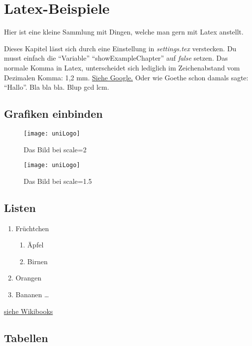\chapter{Latex-Beispiele}
Hier ist eine kleine Sammlung mit Dingen, welche man gern mit Latex anstellt.\par
Dieses Kapitel lässt sich durch eine Einstellung in \emph{settings.tex} verstecken.
Du musst einfach die "`Variable"' \enquote{showExampleChapter} auf \emph{false} setzen.
Das normale Komma in Latex, unterscheidet sich lediglich im Zeichenabstand
vom Dezimalen Komma: 1{,}2 mm. \href{http://google.de}{Siehe Google.}
Oder wie Goethe schon damals sagte: "`Hallo"'\cite[chapter, p.~215]{goethe2016wilhelm}.
Bla bla bla. \parencite[see][p10]{lamport1994latex} Blup \acrlong{gcd} \acrshort{lcm}.

\section{Grafiken einbinden}

\begin{figure}[ht]
\centering
\texttt{[image: uniLogo]}
\caption{Das Bild bei scale=2}
\label{fig: LogoGross}
\end{figure}

\begin{figure}[ht]
\centering
\texttt{[image: uniLogo]}
\caption{Das Bild bei scale=1.5}
\label{fig: LogoKleiner}
\end{figure}

\newpage

\section{Listen}

\begin{enumerate}
\item Früchtchen
\begin{enumerate}
\item Äpfel
\item Birnen
\end{enumerate}
\item Orangen
\item Bananen \ldots
\end{enumerate}

\href{https://en.wikibooks.org/wiki/LaTeX/List_Structures}{siehe Wikibooks}

\section{Tabellen}

